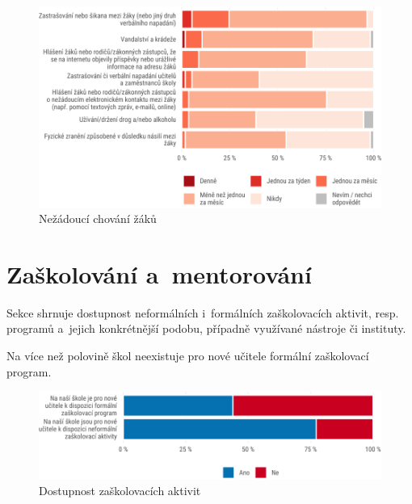 \documentclass[12pt,a4paper,]{report}
\begin{document}
\begin{figure}

{\centering \includegraphics[width=\textwidth]{figs/delinq-1} 

}

\caption{Nežádoucí chování žáků}\label{fig:delinq}
\end{figure}

\hypertarget{zaux161kolovuxe1nuxed-a-mentorovuxe1nuxed}{%
\section{\texorpdfstring{Zaškolování a~mentorování}{Zaškolování amentorování}}\label{zaux161kolovuxe1nuxed-a-mentorovuxe1nuxed}}

Sekce shrnuje dostupnost neformálních i~formálních zaškolovacích aktivit, resp. programů a~jejich konkrétnější podobu, případně využívané nástroje či instituty.

Na více než polovině škol neexistuje pro nové učitele formální zaškolovací program.

\begin{figure}

{\centering \includegraphics[width=\textwidth]{figs/unnamed-chunk-3-1} 

}

\caption{Dostupnost zaškolovacích aktivit}\label{fig:unnamed-chunk-3}
\end{figure}
\end{document}
